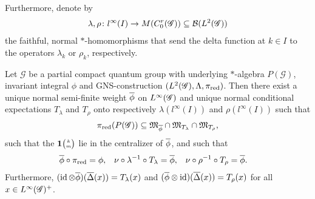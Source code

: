 Furthermore, denote by
\begin{align*}
  \lambda,\rho \colon l^{\infty}(I) \to
  M(C^{r}_{0}(\mathscr{G}))\subseteq  {\cal B}(L^{2}(\mathscr{G}))
\end{align*}
the faithful, normal $*$-homomorphisms that send the delta function at
$k\in I$ to the operators $\lambda_{k}$ or $\rho_{k}$,
respectively.
\begin{Prop} \label{prop:vn-phi} Let $\mathscr{G}$ be a partial
  compact quantum group with underlying $*$-algebra $P(\mathscr{G})$,
  invariant integral $\phi$ and GNS-construction
  $(L^{2}(\mathscr{G}),\Lambda,\pi_{\operatorname{\mathrm{red}}})$. Then there exist a unique normal semi-finite weight $\overline{\phi}$ on $L^{\infty}(\mathscr{G})$ and unique normal
  conditional expectations $T_{\lambda}$ and $T_{\rho}$ onto respectively $\lambda(l^{\infty}(I))$ and $\rho(l^{\infty}(I))$ such that
  \[\pi_{\operatorname{\mathrm{red}}}(P(\mathscr{G})) \subseteq
  \mathfrak{M}_{\overline{\phi}} \cap   \mathfrak{M}_{T_{\lambda}} \cap
  \mathfrak{M}_{T_{\rho}},\] such that the $\mathbf{1}{\tiny {\begin{pmatrix} k\\m\end{pmatrix}}}$ lie in the centralizer of $\overline{\phi}$, and  such that
  \begin{align*}
\overline{\phi} \circ \pi_{\operatorname{\mathrm{red}}} &= \phi,&
\nu \circ \lambda^{-1}\circ T_{\lambda}   &= \overline{\phi}, &  \nu \circ \rho^{-1} \circ
  T_{\rho} &= \overline{\phi}.
  \end{align*}
Furthermore,  $(\operatorname{id} \otimes \overline{\phi})(\overline{\Delta}(x)) =  T_{\lambda}(x)$ and $
    (\overline{\phi} \otimes \operatorname{id})(\overline{\Delta}(x)) = T_{\rho}(x)$ 
 for all
  $x\in L^{\infty}(\mathscr{G})^{+}$.
\end{Prop}
